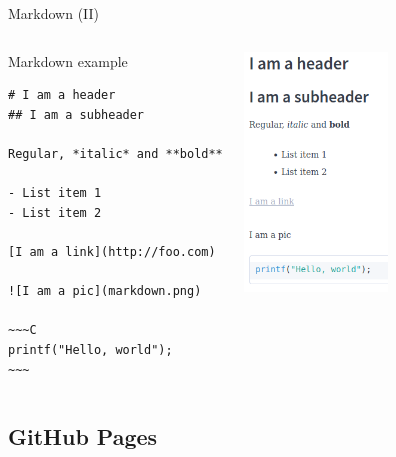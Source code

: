 \documentclass[10pt,compress]{beamer} %
\begin{document}
\begin{frame}[fragile]{Markdown (II)}
	\vspace{-0.3cm}
	\begin{columns}
		\begin{exampleblock}{Markdown example}
			\vspace{-0.3cm}
			\begin{lstlisting}[mathescape]
# I am a header
## I am a subheader

Regular, *italic* and **bold**

- List item 1
- List item 2

[I am a link](http://foo.com)

![I am a pic](markdown.png)

~~~C
printf("Hello, world");
~~~
\end{lstlisting}
			\vspace{-0.2cm}
		\end{exampleblock}
 		\includegraphics[width=0.6\textwidth]{figs/md.png}
	\end{columns}
\end{frame}



\subsection{GitHub Pages}
\end{document}
